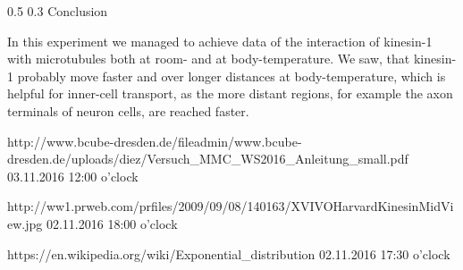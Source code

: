 \documentclass[english, %
parskip=full, %
bibliography=totoc, %
]{scrartcl}
\makeatletter
\renewcommand\subsection{\@startsection 
   {subsection}{2}{0mm}%
   {0.5\baselineskip}%
   {0.3\baselineskip}%
   {\bfseries\sffamily\large}%
   }
\makeatother
\begin{document}
\subsection{Conclusion}

In this experiment we managed to achieve data of the interaction of kinesin-1 with microtubules both at room- and at body-temperature. We saw, that kinesin-1 probably move faster and over longer distances at body-temperature, which is helpful for inner-cell transport, as the more distant regions, for example the axon terminals of neuron cells, are reached faster.  


\begin{thebibliography}{9}

  http://www.bcube-dresden.de/fileadmin/www.bcube-dresden.de/uploads/diez/Versuch\_MMC\_WS2016\_Anleitung\_small.pdf
	03.11.2016
	12:00 o'clock

  http://ww1.prweb.com/prfiles/2009/09/08/140163/XVIVOHarvardKinesinMidView.jpg
	02.11.2016
	18:00 o'clock
	
  https://en.wikipedia.org/wiki/Exponential\_distribution
	02.11.2016
	17:30 o'clock

\end{thebibliography}
\end{document}
